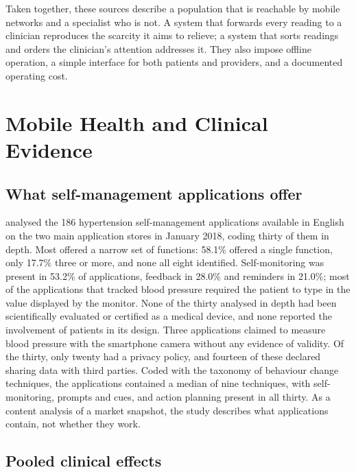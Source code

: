\documentclass[11pt,a4paper,oneside]{report}
\begin{document}
Taken together, these sources describe a population that is reachable by mobile networks and a specialist who is not. A system that forwards every reading to a clinician reproduces the scarcity it aims to relieve; a system that sorts readings and orders the clinician's attention addresses it. They also impose offline operation, a simple interface for both patients and providers, and a documented operating cost.

\section{Mobile Health and Clinical Evidence}\label{sec:outpatient}\label{sec:evidence}

\subsection{What self-management applications offer}\label{sec:apps}

\Textcite{alessa2019} analysed the 186 hypertension self-management applications available in English on the two main application stores in January 2018, coding thirty of them in depth. Most offered a narrow set of functions: 58.1\% offered a single function, only 17.7\% three or more, and none all eight identified. Self-monitoring was present in 53.2\% of applications, feedback in 28.0\% and reminders in 21.0\%; most of the applications that tracked blood pressure required the patient to type in the value displayed by the monitor. None of the thirty analysed in depth had been scientifically evaluated or certified as a medical device, and none reported the involvement of patients in its design. Three applications claimed to measure blood pressure with the smartphone camera without any evidence of validity. Of the thirty, only twenty had a privacy policy, and fourteen of these declared sharing data with third parties. Coded with the taxonomy of behaviour change techniques, the applications contained a median of nine techniques, with self-monitoring, prompts and cues, and action planning present in all thirty. As a content analysis of a market snapshot, the study describes what applications contain, not whether they work.

\subsection{Pooled clinical effects}\label{sec:efficacy}
\end{document}
